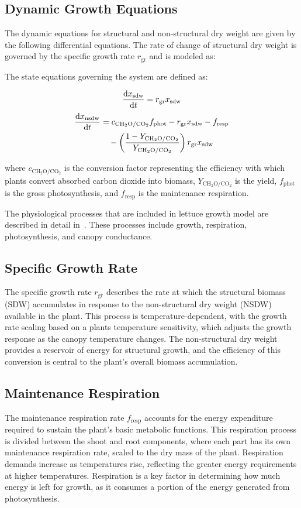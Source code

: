 \documentclass[conference]{IEEEtran}
\newcommand{\ui}[2]{#1_{\mathrm{#2}}}
\newcommand{\coo}{\ensuremath{\mathrm{CO_2}}}
\newcommand{\chho}{\ensuremath{\mathrm{CH_2O}}}
\begin{document}
\subsection{Dynamic Growth Equations} The dynamic equations for structural and non-structural dry weight are given by the following differential equations. The rate of change of structural dry weight is governed by the specific growth rate \( \ui{r}{gr} \) and is modeled as:

The state equations governing the system are defined as:

\[
    \diff{\ui{x}{sdw}}{t} = \ui{r}{gr} \ui{x}{sdw}
\]
\[
    \begin{aligned}
        \diff{\ui{x}{nsdw}}{t} & = c_{\chho/\coo} \ui{f}{phot} - \ui{r}{gr} \ui{x}{sdw} - \ui{f}{resp}                   \\
                               & \quad - \left( \frac{1 - Y_{\chho/\coo}}{Y_{\chho/\coo}} \right) \ui{r}{gr} \ui{x}{sdw}
    \end{aligned}
\]

where \( c_{\chho/\coo} \) is the conversion factor representing the efficiency with which plants convert absorbed carbon dioxide into biomass, \( Y_{\chho/\coo} \) is the yield, \( \ui{f}{phot} \) is the gross photosynthesis, and \( \ui{f}{resp} \) is the maintenance respiration.

The physiological processes that are included in lettuce growth model are described in detail in~\cite{VANHENTEN199455}. These processes include growth, respiration, photosynthesis, and canopy conductance.

\subsection{Specific Growth Rate} The specific growth rate \( \ui{r}{gr} \) describes the rate at which the structural biomass (SDW) accumulates in response to the non-structural dry weight (NSDW) available in the plant. This process is temperature-dependent, with the growth rate scaling based on a plants temperature sensitivity, which adjusts the growth response as the canopy temperature changes. The non-structural dry weight provides a reservoir of energy for structural growth, and the efficiency of this conversion is central to the plant's overall biomass accumulation.

\subsection{Maintenance Respiration} The maintenance respiration rate \( \ui{f}{resp} \) accounts for the energy expenditure required to sustain the plant's basic metabolic functions. This respiration process is divided between the shoot and root components, where each part has its own maintenance respiration rate, scaled to the dry mass of the plant. Respiration demands increase as temperatures rise, reflecting the greater energy requirements at higher temperatures. Respiration is a key factor in determining how much energy is left for growth, as it consumes a portion of the energy generated from photosynthesis.
\end{document}
